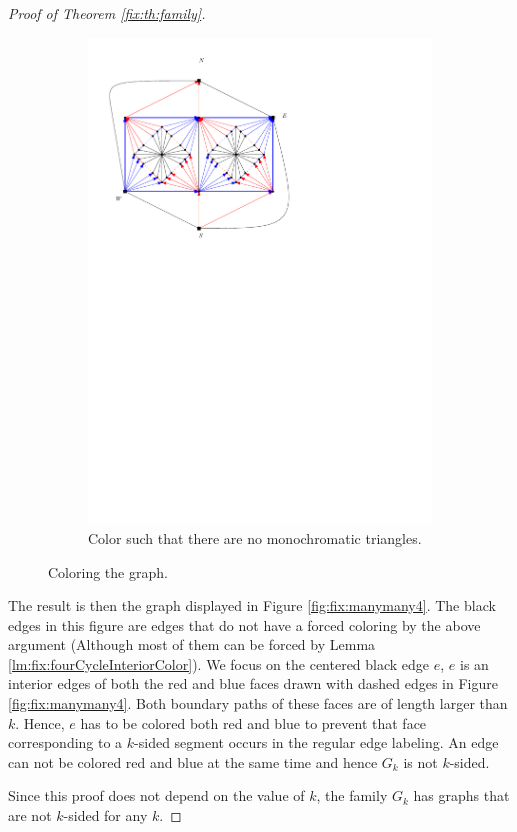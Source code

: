 \begin{proof}[Proof of Theorem \ref{fix:th:family}]
\begin{figure}[h]
\begin{subfigure}[t]{0.3\textwidth}
      \includegraphics[width=\textwidth]{fixExtension/img/manymany3}
      \caption{Color such that there are no monochromatic triangles.}
      \label{fig:fix:manymany3}
    \end{subfigure}
    \caption{Coloring the graph.}
    \label{fig:fix:coloring}
  \end{figure}

  The result is then the graph displayed in Figure \ref{fig:fix:manymany4}. The black edges in this figure are edges that do not have a forced coloring by the above argument (Although most of them can be forced by Lemma \ref{lm:fix:fourCycleInteriorColor}).
  We focus on the centered black edge $e$, $e$ is an interior edges of both the red and blue faces drawn with dashed edges in Figure \ref{fig:fix:manymany4}. Both boundary paths of these faces are of length larger than $k$. Hence, $e$ has to be colored both red and blue to prevent that face corresponding to a $k$-sided segment occurs in the regular edge labeling. An edge can not be colored red and blue at the same time and hence $G_k$ is not $k$-sided.

  Since this proof does not depend on the value of $k$, the family $G_k$ has graphs that are not $k$-sided for any $k$.
\end{proof}


